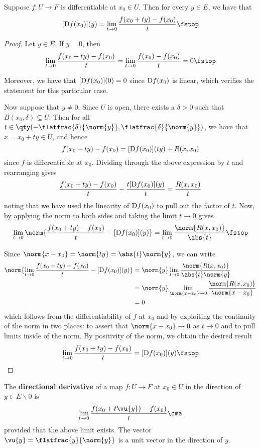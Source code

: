 \begin{proposition}
  \label{thm:direction-deriv}
  Suppose \( f:U\to F \) is differentiable at \( x_0\in U \). Then for every \( y\in E \), we have that
  \[ [\D f(x_0)](y)=\lim_{t\to 0}\frac{f(x_0+ty)-f(x_0)}{t}\fstop \]
\end{proposition}
\begin{proof}
  Let \( y\in E \). If \( y=0 \), then
  \[ \lim_{t\to 0}\frac{f(x_0+ty)-f(x_0)}{t}=\lim_{t\to 0}\frac{f(x_0)-f(x_0)}{t}=0\fstop \]

  Moreover, we have that \( [\text{D} f(x_0)](0)=0 \) since \( \text{D} f(x_0) \) is linear, which verifies the statement for this particular case.

  \vspace{3mm}

  Now suppose that \( y\neq 0 \). Since \( U \) is open, there exists a \( \delta>0 \) such that \( B(x_0,\delta)\subseteq U \). Then for all \( t\in\qty(-\flatfrac{\delta}{\norm{y}},\flatfrac{\delta}{\norm{y}}) \), we have that \( x=x_0+ty\in U \), and hence
  \[ f(x_0+ty)-f(x_0)=[\text{D} f(x_0)](ty)+R(x,x_0) \]
  since \( f \) is differentiable at \( x_0 \). Dividing through the above expression by \( t \) and rearranging gives
  \[ \frac{f(x_0+ty)-f(x_0)}{t}- \frac{t[\text{D} f(x_0)](y)}{t}=\frac{R(x,x_0)}{t} \]
  noting that we have used the linearity of \( \text{D} f(x_0) \) to pull out the factor of \( t \). Now, by applying the norm to both sides and taking the limit \( t\to 0 \) gives
  \[ \lim_{t\to 0}\norm{\frac{f(x_0+ty)-f(x_0)}{t}- [\D f(x_0)](y)}=\lim_{t\to 0}\frac{\norm{R(x,x_0)}}{\abs{t}}\fstop \]

  Since \( \norm{x-x_0}=\norm{ty}=\abs{t}\norm{y} \), we can write
  \begin{align*}
    \norm{\lim_{t\to 0}\frac{f(x_0+ty)-f(x_0)}{t}- [\D f(x_0)](y)}&=\norm{y}\lim_{t\to 0}\frac{\norm{R(x,x_0)}}{\abs{t}\norm{y}}\\
    &= \norm{y}\lim_{\norm{x-x_0}\to 0}\frac{\norm{R(x,x_0)}}{\norm{x-x_0}}\\
    &= 0
  \end{align*}
  which follows from the differentiability of \( f \) at \( x_0 \) and by exploiting the continuity of the norm in two places: to assert that \( \norm{x-x_0}\to 0 \) as \( t\to 0 \) and to pull limits inside of the norm. By positivity of the norm, we obtain the desired result
  \[ \lim_{t\to 0}\frac{f(x_0+ty)-f(x_0)}{t}=[\D f(x_0)](y)\fstop \]
\end{proof}

\begin{definition}
  The \textbf{directional derivative} of a map \( f:U\to F \) at \( x_0\in U \) in the direction of \( y\in E\backslash\qty{0} \) is
  \[ \lim_{t\to 0}\frac{f(x_0+t\vu{y})-f(x_0)}{t}\cma \]
  provided that the above limit exists. The vector \( \vu{y}=\flatfrac{y}{\norm{y}} \) is a unit vector in the direction of \( y \).
\end{definition}


